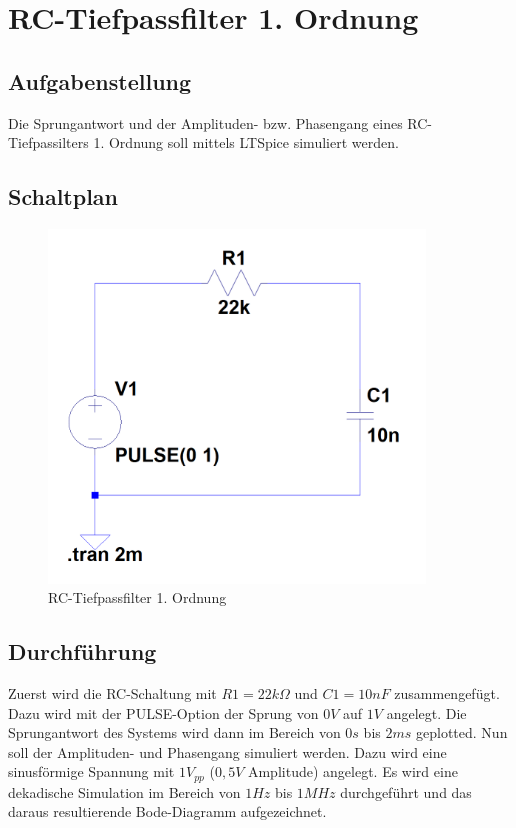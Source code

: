 \documentclass[12pt,a4paper,titlepage]{article}
\begin{document}
\newpage
\setcounter{tocdepth}{1}
\tableofcontents

\newpage
\section{RC-Tiefpassfilter 1. Ordnung}

\subsection{Aufgabenstellung}
Die Sprungantwort und der Amplituden- bzw. Phasengang eines RC-Tiefpassilters 1. Ordnung soll mittels LTSpice simuliert werden.

\subsection{Schaltplan}

\begin{figure}[H]
  \centering
  \includegraphics[width=100mm]{filter01_schaltung.PNG}
  \caption{RC-Tiefpassfilter 1. Ordnung}
\end{figure}

\subsection{Durchführung}
Zuerst wird die RC-Schaltung mit $R1 = 22k\Omega$ und $C1 = 10nF$ zusammengefügt. Dazu wird mit der PULSE-Option der Sprung von $0V$ auf $1V$ angelegt. Die Sprungantwort des Systems wird dann im Bereich von $0s$ bis $2ms$ geplotted. Nun soll der Amplituden- und Phasengang simuliert werden. Dazu wird eine sinusförmige Spannung mit $1V_{pp}$ ($0,5V$ Amplitude) angelegt. Es wird eine dekadische Simulation im Bereich von $1Hz$ bis $1MHz$ durchgeführt und das daraus resultierende Bode-Diagramm aufgezeichnet.
\end{document}
